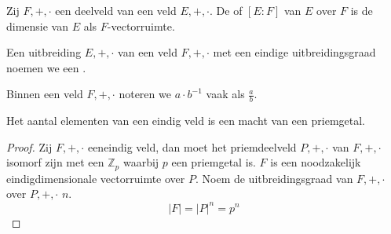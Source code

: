 \documentclass[main.tex]{subfiles}
\begin{document}
\begin{de}
  \label{de:uitbreidingsgraad}
  Zij $F,+,\cdot$ een deelveld van een veld $E,+,\cdot$.
  De  of  $[E:F]$ van $E$ over $F$ is de dimensie van $E$ als $F$-vectorruimte.
\end{de}

\begin{de}
  Een uitbreiding $E,+,\cdot$ van een veld $F,+,\cdot$ met een eindige uitbreidingsgraad noemen we een .
\end{de}

\begin{de}
  Binnen een veld $F,+,\cdot$ noteren we $a\cdot b^{-1}$ vaak als $\frac{a}{b}$.
\end{de}

\begin{st}
  Het aantal elementen van een eindig veld is een macht van een priemgetal.

  \begin{proof}
    Zij $F,+,\cdot$ eeneindig veld, dan moet het priemdeelveld $P,+,\cdot$ van $F,+,\cdot$ isomorf zijn met een $\mathbb{Z}_{p}$ waarbij $p$ een priemgetal is.
    $F$ is een noodzakelijk eindigdimensionale vectorruimte over $P$.
    Noem de uitbreidingsgraad van $F,+,\cdot$ over $P,+,\cdot$ $n$.
    \[ |F| = |P|^{n} = p^{n} \]
  \end{proof}
\end{st}
\end{document}

